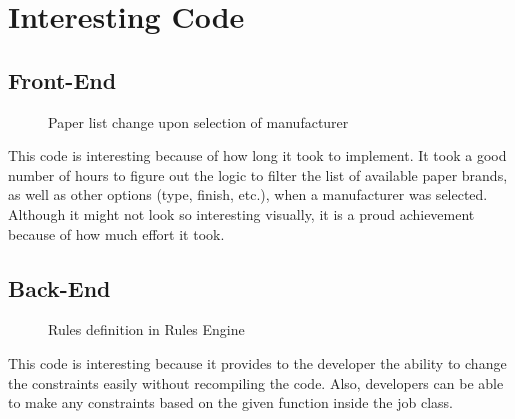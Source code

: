 \documentclass[onecolumn, draftclsnofoot,10pt, compsoc]{IEEEtran}
\begin{document}
\vspace*{\floatsep}
\section{Interesting Code}
\subsection{Front-End}
\begin{figure}[!ht]
    \caption{Paper list change upon selection of manufacturer}
    \label{fig:4}
\end{figure}
\noindent This code is interesting because of how long it took to implement. It took a good number of hours to figure out the logic to filter the list of available paper brands, as well as other options (type, finish, etc.), when a manufacturer was selected. Although it might not look so interesting visually, it is a proud achievement because of how much effort it took.

\newpage
\subsection{Back-End}
\begin{figure}[!ht]
    \caption{Rules definition in Rules Engine}
    \label{fig:5}
\end{figure}
\noindent This code is interesting because it provides to the developer the ability to change the constraints easily without recompiling the code. Also, developers can be able to make any constraints based on the given function inside the job class. 
\end{document}
